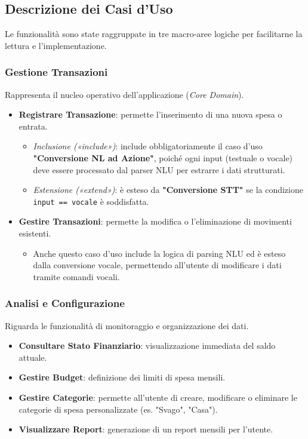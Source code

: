 \subsection{Descrizione dei Casi d'Uso}

Le funzionalità sono state raggruppate in tre macro-aree logiche per facilitarne la lettura e l'implementazione.



\subsubsection{Gestione Transazioni}
Rappresenta il nucleo operativo dell'applicazione (\textit{Core Domain}).
\begin{itemize}
    \item \textbf{Registrare Transazione}: permette l'inserimento di una nuova spesa o entrata.
          \begin{itemize}
              \item \textit{Inclusione («include»)}: include obbligatoriamente il caso d'uso \textbf{"Conversione NL ad Azione"}, poiché ogni input (testuale o vocale) deve essere processato dal parser NLU per estrarre i dati strutturati.
              \item \textit{Estensione («extend»)}: è esteso da \textbf{"Conversione STT"} se la condizione \texttt{input == vocale} è soddisfatta.
          \end{itemize}
    \item \textbf{Gestire Transazioni}: permette la modifica o l'eliminazione di movimenti esistenti.
          \begin{itemize}
              \item Anche questo caso d'uso include la logica di parsing NLU ed è esteso dalla conversione vocale, permettendo all'utente di modificare i dati tramite comandi vocali.
          \end{itemize}
\end{itemize}

\subsubsection{Analisi e Configurazione}
Riguarda le funzionalità di monitoraggio e organizzazione dei dati.
\begin{itemize}
    \item \textbf{Consultare Stato Finanziario}: visualizzazione immediata del saldo attuale.
    \item \textbf{Gestire Budget}: definizione dei limiti di spesa mensili.
    \item \textbf{Gestire Categorie}: permette all'utente di creare, modificare o eliminare le categorie di spesa personalizzate (es. "Svago", "Casa").
    \item \textbf{Visualizzare Report}: generazione di un report mensili per l'utente.
\end{itemize}

